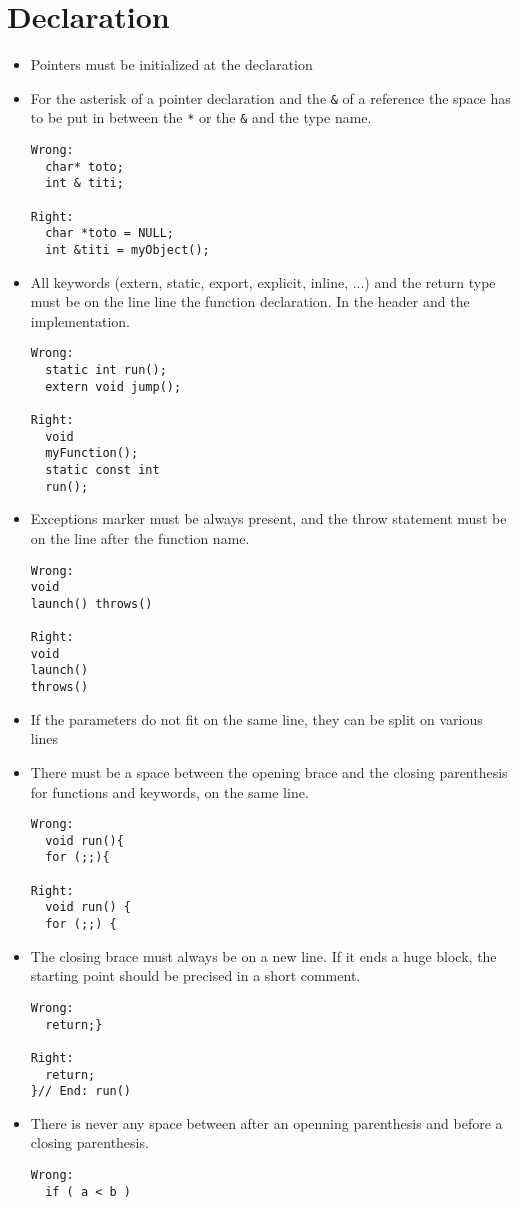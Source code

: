 \documentclass{article}
\begin{document}
\section{Declaration}
\begin{itemize}
\item Pointers must be initialized at the declaration
\item  For the asterisk of a pointer declaration and the \texttt{\&} of a 
reference the space has to be put in between the \texttt{*} or the 
\texttt{\&} and the type name.
 \begin{verbatim}
Wrong:
  char* toto;
  int & titi;

Right:
  char *toto = NULL;
  int &titi = myObject();

\end{verbatim}
\item All keywords (extern, static, export, explicit,
 inline, ...) and the return type must be on the line line the function
 declaration. In the header and the implementation.
\begin{verbatim}
Wrong:
  static int run(); 
  extern void jump();

Right:
  void
  myFunction();
  static const int
  run();
\end{verbatim}
\item Exceptions marker must be always present, and the throw statement
must be on the line after the function name.
\begin{verbatim}
Wrong:
void 
launch() throws()

Right:
void
launch()
throws()
\end{verbatim}

\item If the parameters do not fit on the same line, they can be split on 
various lines
\item There must be a space between the opening brace and the closing
 parenthesis for functions and keywords, on the same line.
\begin{verbatim}
Wrong:
  void run(){
  for (;;){

Right:
  void run() {
  for (;;) {
\end{verbatim}

\item The closing brace must always be on a new line. If it ends a huge 
block, the starting point should be precised in a short comment.
\begin{verbatim}
Wrong:
  return;}

Right:
  return;
}// End: run()
\end{verbatim}
\item There is never any space between after an openning
 parenthesis and before a closing parenthesis.
\begin{verbatim}
Wrong:
  if ( a < b )


\end{verbatim}
\end{itemize}
\end{document}
